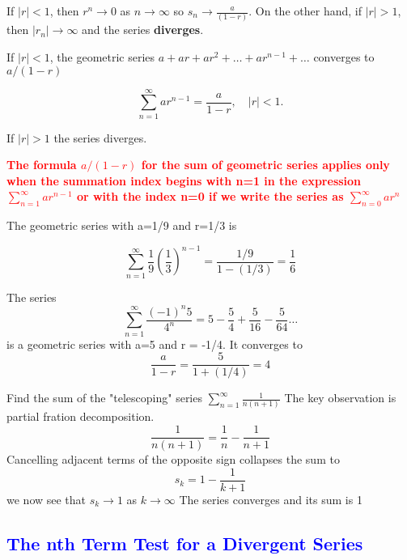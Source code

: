 \documentclass[12pt,a4paper]{article}
\begin{document}
If $ |r| < 1$, then \(r^n \to 0\) as \(n \to  \infty \) so \(s_n \to \frac{a}{\left(1-r\right)}\). On the other hand, if \(|r|>1\), then \(|r_n| \to \infty\) and the series \textbf{diverges}.


\begin{note}
If \(|r|<1\), the geometric series \(a + ar+ ar^2+ \dots + ar^{n-1} + \dots\) converges to \(a/\left(1-r\right)\)
\begin{center}
    \[
        \sum_{n=1}^{\infty} ar^{n-1} = \frac{a}{1-r}, \quad |r|<1.
    \]
\end{center}
If \(|r|>1\) the series diverges.

\end{note}

\textcolor{red}{\textbf{The formula \(a/(1-r)\) for the sum of geometric series applies only when the summation index begins with n=1 in the expression \(\sum_{n=1}^{\infty}ar^{n-1}\) or with the index n=0 if we write the series as \(\sum_{n=0}^{\infty}ar^n\)}}

\newpage

\begin{example}
    The geometric series with a=1/9 and r=1/3 is 
    \begin{center}
        \[
        \sum_{n=1}^{\infty}\frac{1}{9}\left(\frac{1}{3}\right)^{n-1} = \frac{1/9}{1-(1/3)} = \frac{1}{6}    
        \]
    \end{center}
\end{example}

\begin{example}
    The series 
    \[\sum_{n=1}^{\infty} \frac{(-1)^n 5}{4^n} = 5 - \frac{5}{4}+ \frac{5}{16} - \frac{5}{64} \dots \]
    is a geometric series with a=5 and r = -1/4. It converges to
    \[\frac{a}{1-r} = \frac{5}{1 + (1/4)} = 4\]

\end{example}


\begin{example}
    
    Find the sum of the "telescoping" series \(\sum_{n=1}^{\infty}\frac{1}{n(n+1)}\)
    The key observation is partial fration decomposition.
    \[\frac{1}{n(n+1)} = \frac{1}{n} - \frac{1}{n+1}\]
    Cancelling adjacent terms of the opposite sign collapses the sum to 
    \[s_k = 1-\frac{1}{k+1}\]
    we now see that $s_k \to 1$ as $k \to \infty$ The series converges and its sum is 1
\end{example}

\subsection{\textcolor{blue}{The nth Term Test for a Divergent Series}}
\end{document}
